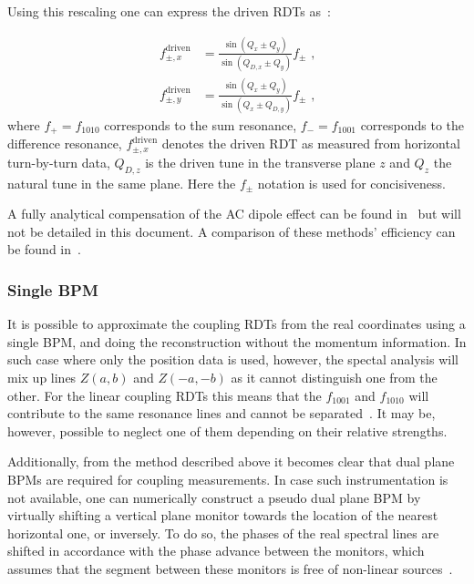 Using this rescaling one can express the driven \glspl{RDT} as~\cite{IPAC:Wegscheider:Forced_Coupling_Resonance_Driving_Terms}:

\begin{equation}
  \begin{aligned}
    f_{\pm, x}^{\mathrm{driven}} &= \frac{\sin \left( Q_x \pm Q_y \right)}{\sin \left( Q_{D,x} \pm Q_y \right)} f_{\pm} \text{ ,} \\
    f_{\pm, y}^{\mathrm{driven}} &= \frac{\sin \left( Q_x \pm Q_y \right)}{\sin \left( Q_x \pm Q_{D,y} \right)} f_{\pm} \text{ ,}
  \end{aligned}
  \label{equation:rescaling_coupling_rdts}
\end{equation}
where \(f_{+} = f_{1010}\) corresponds to the sum resonance, \(f_{-} = f_{1001}\) corresponds to the difference resonance, \(f_{\pm, x}^{\mathrm{driven}}\) denotes the driven \gls{RDT} as measured from horizontal turn-by-turn data, \(Q_{D, z}\) is the driven tune in the transverse plane \(z\) and \(Q_z\) the natural tune in the same plane.
Here the \(f_{\pm}\) notation is used for concisiveness.

A fully analytical compensation of the AC dipole effect can be found in~\cite{REPORT:Miyamoto:Measurement_Coupling_Resonance_Driving_Terms,IPAC:Miyamoto:Measurement_Coupling_RDTs_LHC_AC_Dipole} but will not be detailed in this document.
A comparison of these methods' efficiency can be found in~\cite{IPAC:Wegscheider:NBPM_Momentum_Reconstruction_for_Linear_Coupling_RDTs}.

\subsubsection*{Single BPM}

It is possible to approximate the coupling \glspl{RDT} from the real coordinates using a single \gls{BPM}, and doing the reconstruction without the momentum information.
In such case where only the position data is used, however, the spectal analysis will mix up lines \(Z(a,b)\) and \(Z(-a, -b)\) as it cannot distinguish one from the other.
For the linear coupling RDTs this means that the \(f_{1001}\) and \(f_{1010}\) will contribute to the same resonance lines and cannot be separated~\cite{PHD:Persson}.
It may be, however, possible to neglect one of them depending on their relative strengths.

Additionally, from the method described above it becomes clear that dual plane BPMs are required for coupling measurements.
In case such instrumentation is not available, one can numerically construct a pseudo dual plane BPM by virtually shifting a vertical plane monitor towards the location of the nearest horizontal one, or inversely.
To do so, the phases of the real spectral lines are shifted in accordance with the phase advance between the monitors, which assumes that the segment between these monitors is free of non-linear sources~\cite{PHD:Vanbavinckhove}.

